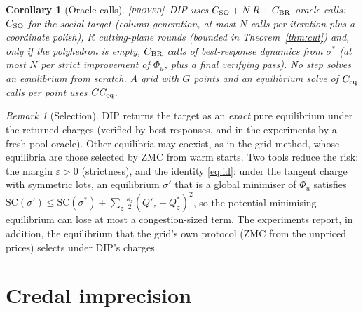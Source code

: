 \documentclass[11pt]{article}
\newtheorem{corollary}[theorem]{Corollary}
\theoremstyle{definition}
\theoremstyle{remark}
\newtheorem{remark}[theorem]{Remark}
\newcommand{\SC}{\mathrm{SC}}
\newcommand{\PROVED}{{\normalfont\textsc{[proved]}}}
\begin{document}
\begin{corollary}[Oracle calls]\label{cor:calls}\PROVED\
DIP uses $C_{\rm SO}+N\,R+C_{\rm BR}$ oracle calls: $C_{\rm SO}$ for the social target (column generation, at most $N$ calls per iteration plus a coordinate polish), $R$ cutting-plane rounds (bounded in Theorem~\ref{thm:cut}) and, only if the polyhedron is empty, $C_{\rm BR}$ calls of best-response dynamics from $\sigma^*$ (at most $N$ per strict improvement of $\Phi_u$, plus a final verifying pass). No step solves an equilibrium from scratch. A grid with $G$ points and an equilibrium solve of $C_{\rm eq}$ calls per point uses $GC_{\rm eq}$.
\end{corollary}

\begin{remark}[Selection]\label{rem:select}
DIP returns the target as an \emph{exact} pure equilibrium under the returned charges (verified by best responses, and in the experiments by a fresh-pool oracle). Other equilibria may coexist, as in the grid method, whose equilibria are those selected by ZMC from warm starts. Two tools reduce the risk: the margin $\varepsilon>0$ (strictness), and the identity \eqref{eq:id}: under the tangent charge with symmetric lots, an equilibrium $\sigma'$ that is a global minimiser of $\Phi_u$ satisfies $\SC(\sigma')\le\SC(\sigma^*)+\sum_z\tfrac{\kappa_z}{2}(Q'_z-Q^*_z)^2$, so the potential-minimising equilibrium can lose at most a congestion-sized term. The experiments report, in addition, the equilibrium that the grid's own protocol (ZMC from the unpriced prices) selects under DIP's charges.
\end{remark}

\section{Credal imprecision}
\end{document}
